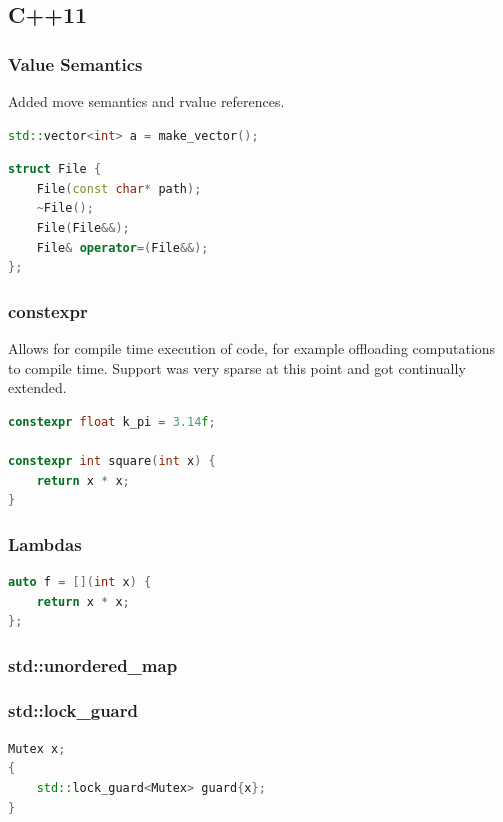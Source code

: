 \documentclass{article}
\begin{document}
\subsection{C++11}
\subsubsection{Value Semantics}
Added move semantics and rvalue references.
\begin{lstlisting}[language=cpp,caption={Move constructors, Move assignment}]
std::vector<int> a = make_vector();
\end{lstlisting}

\begin{lstlisting}[language=cpp,caption={RAII}]
struct File {
    File(const char* path);
    ~File();
    File(File&&);
    File& operator=(File&&);
};
\end{lstlisting}

\subsubsection{constexpr}
Allows for compile time execution of code, for example offloading computations to compile time. Support was very sparse at this point and got continually extended.

\begin{lstlisting}[language=cpp,caption={constexpr (initial form)}]
constexpr float k_pi = 3.14f;

constexpr int square(int x) {
    return x * x;
}
\end{lstlisting}

\subsubsection{Lambdas}
\begin{lstlisting}[language=cpp,caption={C++11 Lambda}]
auto f = [](int x) {
    return x * x;
};
\end{lstlisting}

\subsubsection{std::unordered\_map}

\subsubsection{std::lock\_guard}
\begin{lstlisting}[language=cpp,caption={Lock Guard}]
Mutex x;
{
    std::lock_guard<Mutex> guard{x};
}
\end{lstlisting}
\end{document}
